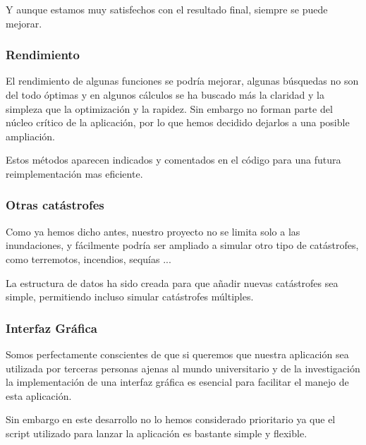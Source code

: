 Y aunque estamos muy satisfechos con el resultado final, siempre se puede
mejorar.
\subsubsection*{Rendimiento}
El rendimiento de algunas funciones se podría mejorar, algunas búsquedas no son
del todo óptimas y en algunos cálculos se ha buscado más la claridad y la
simpleza que la optimización y la rapidez. Sin embargo no forman parte del
núcleo crítico de la aplicación, por lo que hemos decidido dejarlos a una
posible ampliación. 

Estos métodos aparecen indicados y comentados en el código para una futura
reimplementación mas eficiente.
\subsubsection*{Otras catástrofes}
Como ya hemos dicho antes, nuestro proyecto no se limita solo a las
inundaciones, y fácilmente podría ser ampliado a simular otro tipo de
catástrofes, como terremotos, incendios, sequías ...

La estructura de datos ha sido creada para que añadir nuevas catástrofes sea
simple, permitiendo incluso simular catástrofes múltiples.
\subsubsection*{Interfaz Gráfica}
Somos perfectamente conscientes de que si queremos que nuestra aplicación sea
utilizada por terceras personas ajenas al mundo universitario y de la
investigación la implementación de una interfaz gráfica es esencial para
facilitar el manejo de esta aplicación.

Sin embargo en este desarrollo no lo hemos considerado prioritario ya que
el script utilizado para lanzar la aplicación es bastante simple y flexible.


